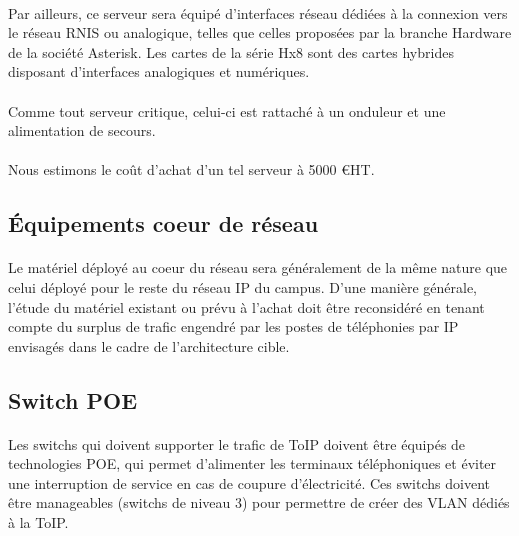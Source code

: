 \paragraph{} Par ailleurs, ce serveur sera équipé d'interfaces réseau dédiées à
la connexion vers le réseau \ac{RNIS} ou analogique, telles que celles proposées
par la branche Hardware de la société Asterisk. Les cartes de la série Hx8 sont
des cartes hybrides disposant d'interfaces analogiques et numériques.

\paragraph{} Comme tout serveur critique, celui-ci est rattaché à un onduleur et
une alimentation de secours.

\paragraph{} Nous estimons le coût d'achat d'un tel serveur à 5000 \euro HT.

\subsection{Équipements coeur de réseau}

\paragraph{} Le matériel déployé au coeur du réseau sera généralement de la même
nature que celui déployé pour le reste du réseau IP du campus. D'une manière
générale, l'étude du matériel existant ou prévu à l'achat doit être reconsidéré
en tenant compte du surplus de trafic engendré par les postes de téléphonies par
IP envisagés dans le cadre de l'architecture cible.

\subsection{Switch POE}

\paragraph{} Les switchs qui doivent supporter le trafic de ToIP doivent être
équipés de technologies \ac{POE}, qui permet d'alimenter les terminaux
téléphoniques et éviter une interruption de service en cas de coupure
d'électricité. Ces switchs doivent être manageables (switchs de niveau 3) pour
permettre de créer des VLAN dédiés à la ToIP.


